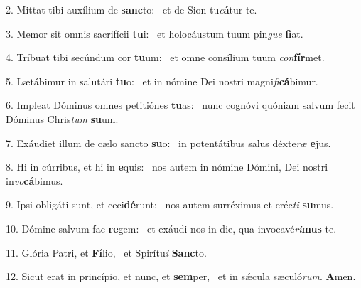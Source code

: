 2. Mittat tibi auxílium de \textbf{sanc}to: \ast\  et de Sion tu\textit{e}\textbf{á}tur te.\

3. Memor sit omnis sacrifícii \textbf{tu}i: \ast\  et holocáustum tuum pin\textit{gue} \textbf{fi}at.\

4. Tríbuat tibi secúndum cor \textbf{tu}um: \ast\  et omne consílium tuum \textit{con}\textbf{fír}met.\

5. Lætábimur in salutári \textbf{tu}o: \ast\  et in nómine Dei nostri magni\textit{fi}\textbf{cá}bimur.\

6. Impleat Dóminus omnes petitiónes \textbf{tu}as: \ast\  nunc cognóvi quóniam salvum fecit Dóminus Chris\textit{tum} \textbf{su}um.\

7. Exáudiet illum de cælo sancto \textbf{su}o: \ast\  in potentátibus salus déxte\textit{ræ} \textbf{e}jus.\

8. Hi in cúrribus, et hi in \textbf{e}quis: \ast\  nos autem in nómine Dómini, Dei nostri in\textit{vo}\textbf{cá}bimus.\

9. Ipsi obligáti sunt, et ceci\textbf{dé}runt: \ast\  nos autem surréximus et eréc\textit{ti} \textbf{su}mus.\

10. Dómine salvum fac \textbf{re}gem: \ast\  et exáudi nos in die, qua invocavé\textit{ri}\textbf{mus} te.\

11. Glória Patri, et \textbf{Fí}lio, \ast\  et Spirítu\textit{i} \textbf{Sanc}to.\

12. Sicut erat in princípio, et nunc, et \textbf{sem}per, \ast\  et in sǽcula sæculó\textit{rum}. \textbf{A}men.\

